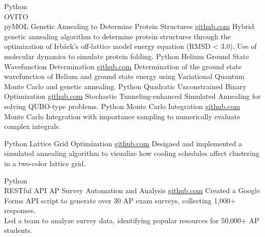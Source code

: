 \documentclass[9pt]{developercv} %
\begin{document}
\begin{entrylist}
    \entry
		{Python \\ OVITO \\ pyMOL }
		{Genetic Annealing to Determine Protein Structures}
		{\href{https://github.com/lonelyneutrin0/Protein-Structure-Prediction}{github.com}}
		{Hybrid genetic annealing algorithm to determine protein structures through the optimization of Irbäck's off-lattice model energy equation (RMSD < 3.0). Use of molecular dynamics to simulate protein folding.}
    \entry
		{Python}
		{Helium Ground State Wavefunction Determination}
		{\href{https://github.com/lonelyneutrin0/QMCGA}{github.com}}
		{Determination of the ground state wavefunction of Helium and ground state energy using Variational Quantum Monte Carlo and genetic annealing.}
	\entry
		{Python}
		{Quadratic Unconstrained Binary Optimization}
		{\href{https://github.com/lonelyneutrin0/qubo}{github.com}}
		{Stochastic Tunneling-enhanced Simulated Annealing for solving QUBO-type problems.}
		\entry
		{Python}
		{Monte Carlo Integration}
		{\href{https://github.com/lonelyneutrin0/MNI}{github.com}}
		{Monte Carlo Integration with importance sampling to numerically evaluate complex integrals.}
	
	\entry
		{Python}
		{Lattice Grid Optimization}
		{\href{https://github.com/lonelyneutrin0/lattice_grid}{github.com}}
		{Designed and implemented a simulated annealing algorithm to visualize how cooling schedules affect clustering in a two-color lattice grid.}
	
	\entry
	{Python \\ RESTful API}
	{AP Survey Automation and Analysis}
	{\href{https://github.com/lonelyneutrin0/APSurveyAutomation}{github.com}}
	{Created a Google Forms API script to generate over 30 AP exam surveys, collecting 1,000+ responses.\\Led a team to analyze survey data, identifying popular resources for 50,000+ AP students.}
	\end{entrylist}
	
\end{document}
